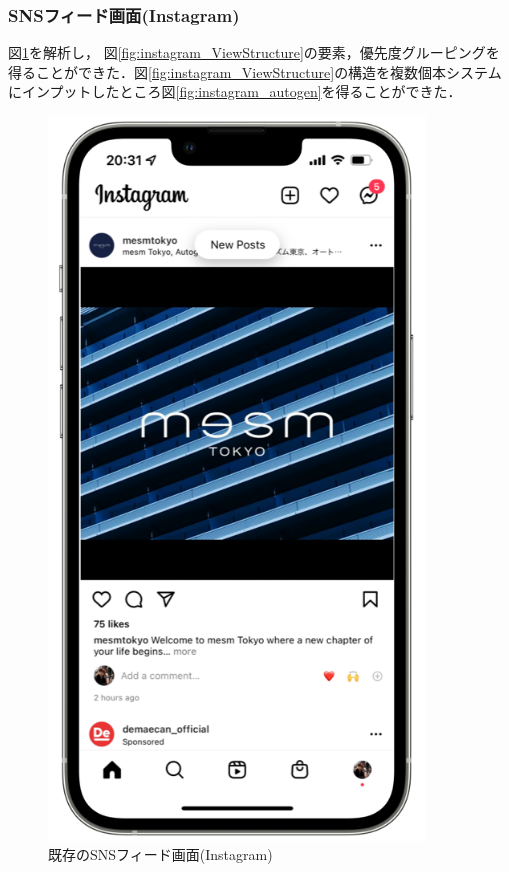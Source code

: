 \subsubsection{SNSフィード画面(Instagram)}
図\ref{fig:instagram_screenshot}を解析し， 図\ref{fig:instagram_ViewStructure}の要素，優先度グルーピングを得ることができた．図\ref{fig:instagram_ViewStructure}の構造を複数個本システムにインプットしたところ図\ref{fig:instagram_autogen}を得ることができた．


\begin{figure}[htbp]
  \begin{minipage}{\hsize}
    \begin{center}
       \includegraphics[width=100mm]{img/instagram_screenshot.png}
    \end{center}
    \caption{既存のSNSフィード画面(Instagram)}
    \label{fig:instagram_screenshot}
  \end{minipage}
\end{figure}

